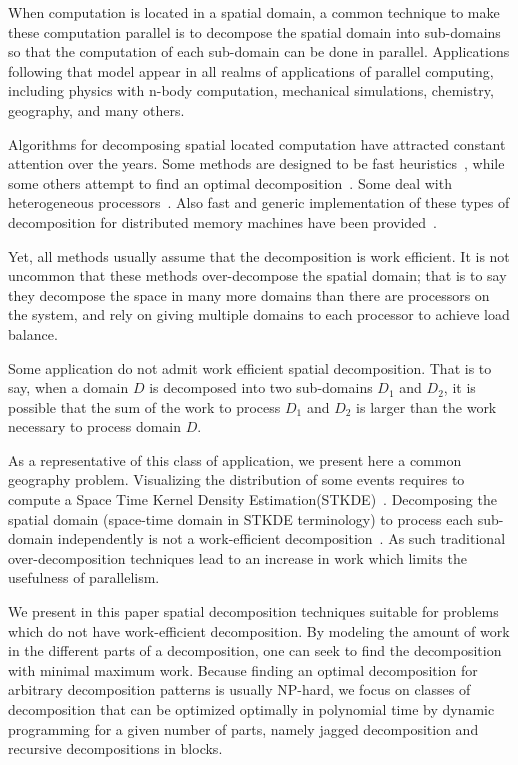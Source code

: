 \documentclass[10pt, conference, compsocconf]{IEEEtran}
\begin{document}
When computation is located in a spatial domain, a common technique to
make these computation parallel is to decompose the spatial domain
into sub-domains so that the computation of each sub-domain can be done
in parallel. Applications following that model appear in all realms of
applications of parallel computing, including physics with n-body
computation, mechanical simulations, chemistry, geography, and many others.

Algorithms for decomposing spatial located computation have attracted
constant attention over the years. Some methods are
designed to be fast heuristics~\cite{berger87}, while some others attempt to
find an optimal decomposition~\cite{saule12-jpdc-spart}. Some deal with
heterogeneous processors~\cite{pinar08}. Also fast and generic
implementation of these types of decomposition for distributed memory
machines have been provided~\cite{DeveciRDC16}.

Yet, all methods usually assume that the decomposition is work
efficient. It is not uncommon that these methods over-decompose the
spatial domain; that is to say they decompose the space in many more
domains than there are processors on the system, and rely on giving
multiple domains to each processor to achieve load balance.

Some application do not admit work efficient spatial
decomposition. That is to say, when a domain $D$ is decomposed into two
sub-domains $D_1$ and $D_2$, it is possible that the sum of the work to
process $D_1$ and $D_2$ is larger than the work necessary to process
domain $D$.

As a representative of this class of application, we present here
a common geography problem. Visualizing the distribution of some events
requires to compute a Space Time Kernel Density
Estimation(STKDE)~\cite{delmelle2013spatio}. Decomposing the spatial domain
(space-time domain in STKDE terminology) to process each sub-domain
independently is not a work-efficient decomposition~\cite{Saule17-ICPP}. As
such traditional over-decomposition techniques lead to an increase in
work which limits the usefulness of parallelism.

We present in this paper spatial decomposition techniques suitable for
problems which do not have work-efficient decomposition. By modeling
the amount of work in the different parts of a decomposition, one can
seek to find the decomposition with minimal maximum work. Because
finding an optimal decomposition for arbitrary decomposition patterns
is usually NP-hard, we focus on classes of decomposition that can be
optimized optimally in polynomial time by dynamic programming for a
given number of parts, namely jagged decomposition and recursive
decompositions in blocks.
\end{document}
